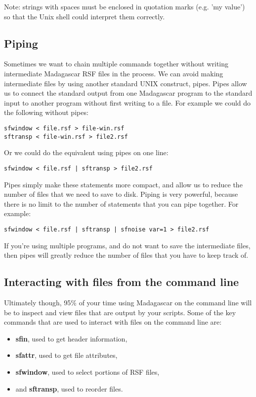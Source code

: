 Note: strings with spaces must be enclosed in quotation marks
(e.g. 'my value') so that the Unix shell could interpret them correctly.

\subsection{Piping}
Sometimes we want to chain multiple commands together without writing intermediate Madagascar RSF files in the process. We can avoid making intermediate files by using another standard UNIX construct, pipes. Pipes allow us to connect the standard output from one Madagascar program to the standard input to another program without first writing to a file. For example we could do the following without pipes:
\begin{verbatim}
sfwindow < file.rsf > file-win.rsf
sftransp < file-win.rsf > file2.rsf
\end{verbatim}
Or we could do the equivalent using pipes on one line:
\begin{verbatim}
sfwindow < file.rsf | sftransp > file2.rsf
\end{verbatim}
Pipes simply make these statements more compact, and allow us to reduce the number of files that we need to save to disk.  Piping is very powerful, because there is no limit to the number of statements that you can pipe together.  For example:

\begin{verbatim}
sfwindow < file.rsf | sftransp | sfnoise var=1 > file2.rsf 
\end{verbatim}
If you're using multiple programs, and do not want to save the intermediate files, then pipes will greatly reduce the number of files that you have to keep track of.  

\subsection{Interacting with files from the command line}

Ultimately though, 95\% of your time using Madagascar on the command line will be to inspect and view files that are output by your scripts. Some of the key commands that are used to interact with files on the command line are:

\begin{itemize}
\item \textbf{sfin}, used to get header information,
\item \textbf{sfattr}, used to get file attributes,
\item \textbf{sfwindow}, used to select portions of RSF files,
\item and \textbf{sftransp}, used to reorder files.
\end{itemize}


